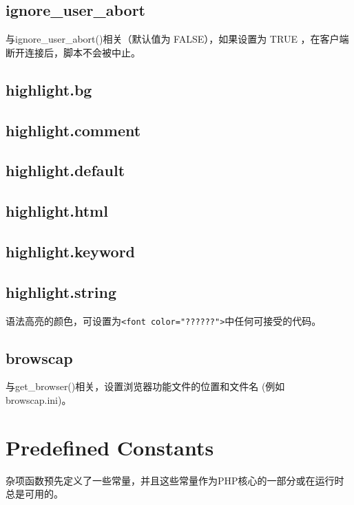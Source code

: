 \subsection{ignore\_user\_abort}


与ignore\_user\_abort()相关（默认值为 FALSE），如果设置为 TRUE ，在客户端断开连接后，脚本不会被中止。

\subsection{highlight.bg}

\subsection{highlight.comment}


\subsection{highlight.default}


\subsection{highlight.html}


\subsection{highlight.keyword}


\subsection{highlight.string}

语法高亮的颜色，可设置为\texttt{<font color="??????">}中任何可接受的代码。



\subsection{browscap}

与get\_browser()相关，设置浏览器功能文件的位置和文件名 (例如 browscap.ini)。


\section{Predefined Constants}

杂项函数预先定义了一些常量，并且这些常量作为PHP核心的一部分或在运行时总是可用的。


